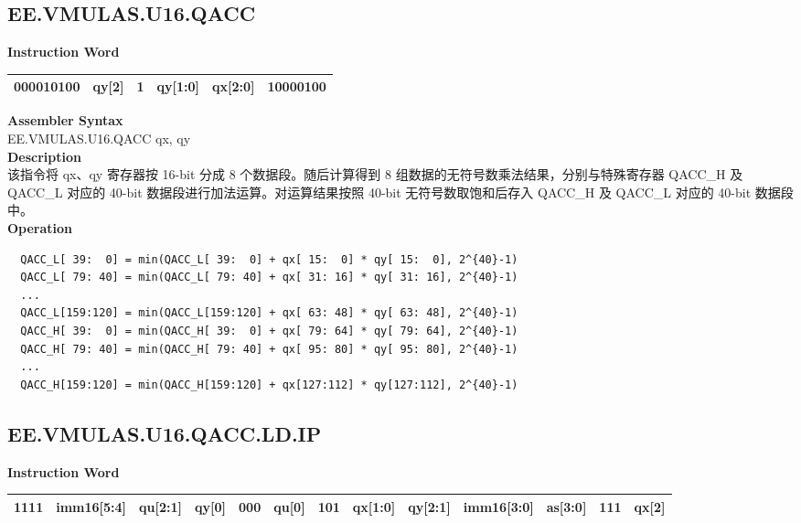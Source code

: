 \clearpage
\subsection{EE.VMULAS.U16.QACC}\label{instruction:EEVMULASU16QACC}
\setlength\tabcolsep{6pt}
\textbf{Instruction Word} \\
\begin{tabular}{|c|c|c|c|c|c|}
	\hline
	000010100 & qy[2] & 1 & qy[1:0] & qx[2:0] & 10000100 \\
	\hline
\end{tabular}

\textbf{Assembler Syntax} \\
EE.VMULAS.U16.QACC qx, qy \\
\textbf{Description} \\
该指令将 qx、qy 寄存器按 16-bit 分成 8 个数据段。随后计算得到 8 组数据的无符号数乘法结果，分别与特殊寄存器 QACC\_H 及 QACC\_L 对应的 40-bit 数据段进行加法运算。对运算结果按照 40-bit 无符号数取饱和后存入 QACC\_H 及 QACC\_L 对应的 40-bit 数据段中。\\
\textbf{Operation}
\begin{lstlisting}
  QACC_L[ 39:  0] = min(QACC_L[ 39:  0] + qx[ 15:  0] * qy[ 15:  0], 2^{40}-1)
  QACC_L[ 79: 40] = min(QACC_L[ 79: 40] + qx[ 31: 16] * qy[ 31: 16], 2^{40}-1)
  ...
  QACC_L[159:120] = min(QACC_L[159:120] + qx[ 63: 48] * qy[ 63: 48], 2^{40}-1)
  QACC_H[ 39:  0] = min(QACC_H[ 39:  0] + qx[ 79: 64] * qy[ 79: 64], 2^{40}-1)
  QACC_H[ 79: 40] = min(QACC_H[ 79: 40] + qx[ 95: 80] * qy[ 95: 80], 2^{40}-1)
  ...
  QACC_H[159:120] = min(QACC_H[159:120] + qx[127:112] * qy[127:112], 2^{40}-1)
\end{lstlisting}

\clearpage
\subsection{EE.VMULAS.U16.QACC.LD.IP}\label{instruction:EEVMULASU16QACCLDIP}
\setlength\tabcolsep{6pt}
\textbf{Instruction Word} \\
\begin{tabular}{|c|c|c|c|c|c|c|c|c|c|c|c|c|}
	\hline
	1111 & imm16[5:4] & qu[2:1] & qy[0] & 000 & qu[0] & 101 & qx[1:0] & qy[2:1] & imm16[3:0] & as[3:0] & 111 & qx[2] \\
	\hline
\end{tabular}

